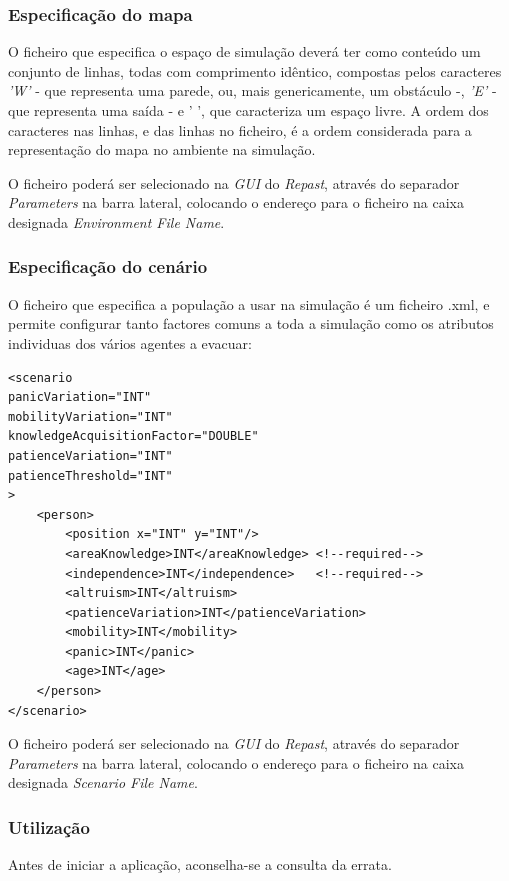 \documentclass[12pt]{article}
\begin{document}
\begin{titlepage}
\subsubsection{Especificação do mapa}

O ficheiro que especifica o espaço de simulação deverá ter como conteúdo um conjunto de linhas, todas com comprimento idêntico, compostas pelos caracteres \textit{'W'} - que representa uma parede, ou, mais genericamente, um obstáculo -, \textit{'E'} - que representa uma saída - e {' '}, que caracteriza um espaço livre. A ordem dos caracteres nas linhas, e das linhas no ficheiro, é a ordem considerada para a representação do mapa no ambiente na simulação.

O ficheiro poderá ser selecionado na \textit{GUI} do \textit{Repast}, através do separador \textit{Parameters} na barra lateral, colocando o endereço para o ficheiro na caixa designada \textit{Environment File Name}.

\subsubsection{Especificação do cenário}

O ficheiro que especifica a população a usar na simulação é um ficheiro .xml, e permite configurar tanto factores comuns a toda a simulação como os atributos individuas dos vários agentes a evacuar:
\begin{lstlisting}
<scenario 
panicVariation="INT"
mobilityVariation="INT"
knowledgeAcquisitionFactor="DOUBLE"
patienceVariation="INT"
patienceThreshold="INT"
>
	<person>
		<position x="INT" y="INT"/>
		<areaKnowledge>INT</areaKnowledge> <!--required-->
		<independence>INT</independence>   <!--required-->
		<altruism>INT</altruism>
		<patienceVariation>INT</patienceVariation>
		<mobility>INT</mobility>
		<panic>INT</panic>
		<age>INT</age>
	</person>
</scenario>
\end{lstlisting}

O ficheiro poderá ser selecionado na \textit{GUI} do \textit{Repast}, através do separador \textit{Parameters} na barra lateral, colocando o endereço para o ficheiro na caixa designada \textit{Scenario File Name}.

\subsubsection{Utilização}

Antes de iniciar a aplicação, aconselha-se a consulta da errata.


\end{titlepage}
\end{document}
